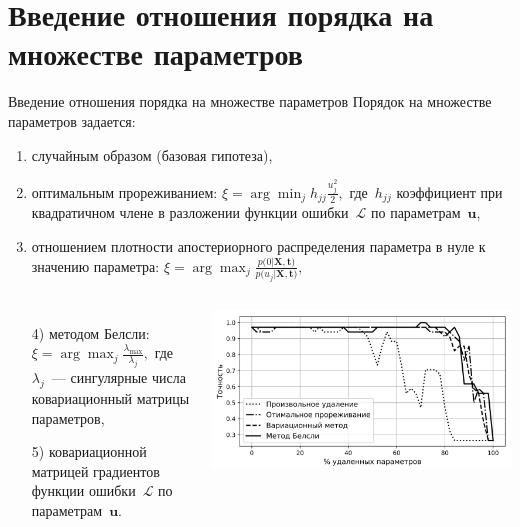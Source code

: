 \documentclass[10pt,pdf,hyperref={unicode}]{beamer}
\begin{document}
\section{Введение отношения порядка на множестве параметров}
\justifying
\begin{frame}{Введение отношения порядка на множестве параметров}
Порядок на множестве параметров задается:
\begin{enumerate}[1)]
\justifying
	\item случайным образом (базовая гипотеза),
	\item оптимальным прореживанием:
	$
	\xi = \arg \min_{j} h_{jj}\frac{u_j^2}{2},
	$
	где~$h_{jj}$ коэффициент при квадратичном члене в разложении функции ошибки~$\mathcal{L}$ по параметрам~$\mathbf{u}$,
	\item отношением плотности апостериорного распределения параметра в нуле к значению параметра:
	$
	\xi = \arg \max_{j} \frac{p\bigr(0|\mathbf{X}, \mathbf{t}\bigr)}{p\bigr(u_j|\mathbf{X}, \mathbf{t}\bigr)},
	$
\end{enumerate}
\begin{columns}
\vspace{-0.8cm}
\begin{enumerate}
\justifying
	\item[4)] методом Белсли:\\
	$
	\xi = \arg \max_{j} \frac{\lambda_{\max}}{\lambda_{j}}, 
	$
	где~$\lambda_j$~--- сингулярные числа ковариационный матрицы параметров,
	\item[5)] ковариационной матрицей градиентов функции ошибки~$\mathcal{L}$ по параметрам~$\mathbf{u}$.
\end{enumerate}
\includegraphics[width=\textwidth]{figures/relevant_class.png}
\end{columns}
\end{frame}
\end{document}
